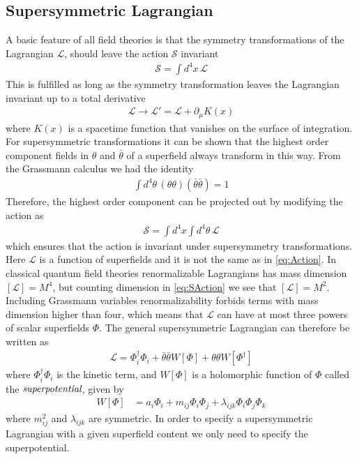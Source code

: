 \subsection{Supersymmetric Lagrangian}
A basic feature of all field theories is that the symmetry transformations of the Lagrangian $\mathcal{L}$, should leave the action $\mathcal{S}$ invariant
\begin{align}\label{eq:Action}
    \mathcal{S}=\int d^{4}x\,\mathcal{L}
\end{align}
This is fulfilled as long as the symmetry transformation leaves the Lagrangian invariant up to a total derivative
\begin{align*}
    \mathcal{L}\rightarrow \mathcal{L'}=\mathcal{L}+\partial_{\mu}K(x)
\end{align*}
where $K(x)$ is a spacetime function that vanishes on the surface of integration. For supersymmetric transformations it can be shown that the highest order component fields in $\theta$ and $\bar{\theta}$ of a superfield always transform in this way. From the Grassmann calculus we had the identity
\begin{align*}
    \int d^{4}\theta \, (\theta\theta)(\bar{\theta}\bar{\theta})=1
\end{align*}
Therefore, the highest order component can be projected out by modifying the action as
\begin{align}\label{eq:SAction}
    \mathcal{S}=\int d^{4}x\int d^{4}\theta \,\mathcal{L}
\end{align}
which ensures that the action is invariant under supersymmetry transformations. Here $\mathcal{L}$ is a function of superfields and it is not the same as in \cref{eq:Action}. In classical quantum field theories renormalizable Lagrangians has mass dimension $[\mathcal{L}]=M^{4}$, but counting dimension in \cref{eq:SAction} we see that $[\mathcal{L}]=M^{2}$. Including Grassmann variables renormalizability forbids terms with mass dimension higher than four, which means that $\mathcal{L}$ can have at most three powers of scalar superfields $\Phi$. The general supersymmetric Lagrangian can therefore be written as
\begin{align}
    \mathcal{L}=\Phi_{i}^{\dagger}\Phi_{i}+\bar{\theta}\bar{\theta}W[\Phi]+\theta\theta W[\Phi^{\dagger}]
\end{align}
where $\Phi_{i}^{\dagger}\Phi_{i}$ is the kinetic term, and $W[\Phi]$ is a holomorphic function of $\Phi$ called the $\emph{superpotential}$, given by
\begin{align*}
    W[\Phi]&=a_{i}\Phi_{i}+m_{ij}\Phi_{i}\Phi_{j}+\lambda_{ijk}\Phi_{i}\Phi_{j}\Phi_{k}
\end{align*}
where $m_{ij}^{2}$ and $\lambda_{ijk}$ are symmetric. In order to specify a supersymmetric Lagrangian with a given superfield content we only need to specify the superpotential.



